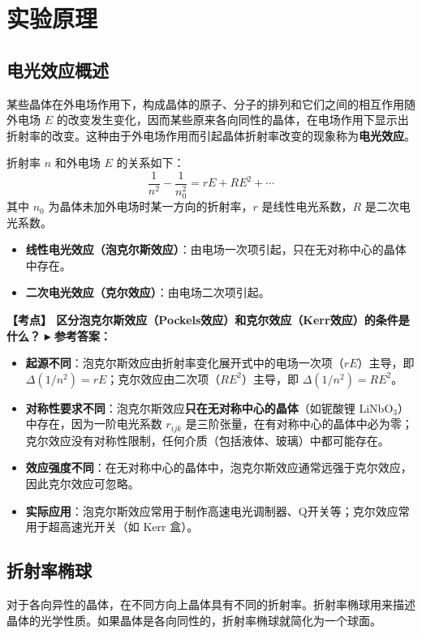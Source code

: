 \documentclass[12pt,a4paper]{article}
\newcommand{\exam}[1]{\textbf{\color{blue!70!black}【考点】#1}}
\newcommand{\answer}[1]{\vspace{2pt}\noindent\textbf{\color{teal!80!black}▸ 参考答案：}#1\vspace{4pt}}
\newcommand{\qa}[2]{\exam{#1}\answer{#2}}
\begin{document}
\section{实验原理}

\subsection{电光效应概述}
某些晶体在外电场作用下，构成晶体的原子、分子的排列和它们之间的相互作用随外电场 \(E\) 的改变发生变化，因而某些原来各向同性的晶体，在电场作用下显示出折射率的改变。这种由于外电场作用而引起晶体折射率改变的现象称为\textbf{电光效应}。

折射率 \(n\) 和外电场 \(E\) 的关系如下：
\begin{equation}
    \frac{1}{n^2} - \frac{1}{n_0^2} = rE + RE^2 + \cdots
\end{equation}
其中 \(n_0\) 为晶体未加外电场时某一方向的折射率，\(r\) 是线性电光系数，\(R\) 是二次电光系数。

\begin{itemize}
    \item \textbf{线性电光效应（泡克尔斯效应）}：由电场一次项引起，只在无对称中心的晶体中存在。
    \item \textbf{二次电光效应（克尔效应）}：由电场二次项引起。
\end{itemize}

\qa{
    区分泡克尔斯效应（Pockels效应）和克尔效应（Kerr效应）的条件是什么？
}{
    \begin{itemize}
        \item \textbf{起源不同}：泡克尔斯效应由折射率变化展开式中的电场一次项（$rE$）主导，即 $\Delta(1/n^2) = rE$；克尔效应由二次项（$RE^2$）主导，即 $\Delta(1/n^2) = RE^2$。
        \item \textbf{对称性要求不同}：泡克尔斯效应\textbf{只在无对称中心的晶体}（如铌酸锂 LiNbO$_3$）中存在，因为一阶电光系数 $r_{ijk}$ 是三阶张量，在有对称中心的晶体中必为零；克尔效应没有对称性限制，任何介质（包括液体、玻璃）中都可能存在。
        \item \textbf{效应强度不同}：在无对称中心的晶体中，泡克尔斯效应通常远强于克尔效应，因此克尔效应可忽略。
        \item \textbf{实际应用}：泡克尔斯效应常用于制作高速电光调制器、Q开关等；克尔效应常用于超高速光开关（如 Kerr 盒）。
    \end{itemize}
}

\subsection{折射率椭球}
对于各向异性的晶体，在不同方向上晶体具有不同的折射率。折射率椭球用来描述晶体的光学性质。如果晶体是各向同性的，折射率椭球就简化为一个球面。
\end{document}
